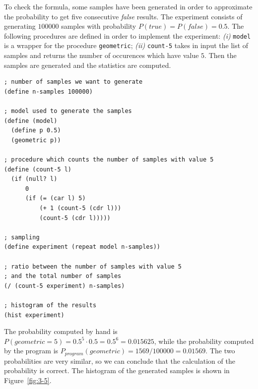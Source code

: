 To check the formula, some samples have been generated in order to approximate the probability to get five consecutive 
\textit{false} results. The experiment consists of generating $ 100000 $ samples with probability 
$ P(true) = P(false) = 0.5 $.
The following procedures are defined in order to implement the experiment: \textit{(i)} \texttt{model} is a wrapper for the 
procedure \texttt{geometric}; \textit{(ii)} \texttt{count-5} takes in input the list of samples and returns the number of
occurences which have value $ 5 $.
Then the samples are generated and the statistics are computed.
\begin{lstlisting}[caption={Experiment to approximate the probability of getting the first occurence of success at the sixth trial},
    captionpos=b]
; number of samples we want to generate
(define n-samples 100000)

; model used to generate the samples
(define (model)
  (define p 0.5)
  (geometric p))

; procedure which counts the number of samples with value 5
(define (count-5 l)
  (if (null? l)
      0
      (if (= (car l) 5)
          (+ 1 (count-5 (cdr l)))
          (count-5 (cdr l)))))

; sampling
(define experiment (repeat model n-samples))

; ratio between the number of samples with value 5
; and the total number of samples
(/ (count-5 experiment) n-samples)

; histogram of the results
(hist experiment)
\end{lstlisting}
The probability computed by hand is $ P(geometric = 5) = 0.5^{5} \cdot 0.5 = 0.5^{6} = 0.015625 $, while the probability computed
by the program is $ P_{program}(geometric) = 1569/100000 = 0.01569 $.
The two probabilities are very similar, so we can conclude that the calculation of the probability is correct.
The histogram of the generated samples is shown in Figure~\ref{fig:3-5}.

